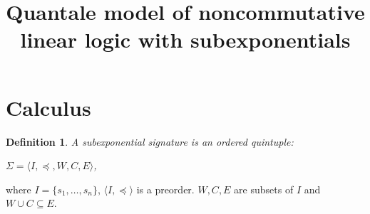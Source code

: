 \documentclass[a4paper]{article}
\date{}
\title{Quantale model of noncommutative linear logic with subexponentials}
\newtheorem{defin}{Definition}
\begin{document}
\maketitle

\section{Calculus}

\begin{defin} A subexponential signature is an ordered quintuple:

  $\Sigma = \langle I, \preceq, W, C, E \rangle$,
\end{defin}

where $I = \{ s_1, \dots, s_n\}$, $\langle I, \preceq \rangle$ is a preorder.
$W, C, E$ are subsets of $I$ and $W \cup C \subseteq E$.
\end{document}
